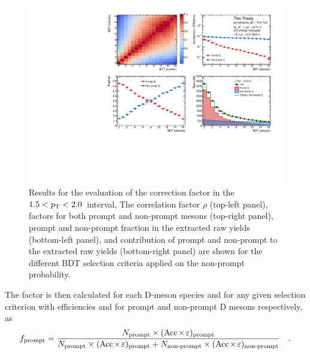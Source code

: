 \begin{figure}[htb]
    \begin{center}
    \includegraphics[width=\textwidth]{Figures/Chapter 6/DsPromptFrac.pdf}
    \caption{Results for the evaluation of the \ds \fp correction factor in the $1.5<p_\mathrm{T}<2.0$~\gevc interval. The correlation factor $\rho$ (top-left panel), \aeff factors for both prompt and non-prompt \ds mesons (top-right panel), prompt and non-prompt fraction in the extracted \ds raw yields (bottom-left panel), and contribution of prompt and non-prompt to the extracted raw yields (bottom-right panel) are shown for the different BDT selection criteria applied on the non-prompt probability.} 
    \label{fig:fp} 
    \end{center}
\end{figure}

The \fp factor is then calculated for each D-meson species and for any given selection criterion with efficiencies \aeffp and \aeffnp for prompt and non-prompt D mesons respectively, as
\begin{equation*}
    f_\mathrm{prompt} = \frac{N_\mathrm{prompt}\times(\mathrm{Acc}\mkern-2mu\times\mkern-2mu\varepsilon)_\mathrm{prompt}}{N_\mathrm{prompt}\times(\mathrm{Acc}\mkern-2mu\times\mkern-2mu\varepsilon)_\mathrm{prompt} + N_\mathrm{non\text{-}prompt}\times(\mathrm{Acc}\mkern-2mu\times\mkern-2mu\varepsilon)_\mathrm{non\text{-}prompt}}\quad .
\end{equation*}

